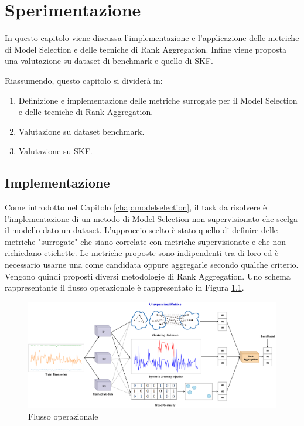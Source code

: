 \chapter{Sperimentazione}
\label{chap:impl}

In questo capitolo viene discussa l'implementazione e l'applicazione delle metriche di Model Selection e delle tecniche di Rank Aggregation. Infine viene proposta una valutazione su dataset di benchmark e quello di SKF.

Riassumendo, questo capitolo si dividerà in:
\begin{enumerate}
	\item Definizione e implementazione delle metriche surrogate per il Model Selection e delle tecniche di Rank Aggregation.
	\item Valutazione su dataset benchmark.
	\item Valutazione su SKF.
\end{enumerate}


\section{Implementazione}
Come introdotto nel Capitolo \ref{chap:modelselection}, il task da risolvere è l'implementazione di un metodo di Model Selection non supervisionato che scelga il modello dato un dataset. L'approccio scelto è stato quello di definire delle metriche "surrogate" che siano correlate con metriche supervisionate e che non richiedano etichette. Le metriche proposte sono indipendenti tra di loro ed è necessario usarne una come candidata oppure aggregarle secondo qualche criterio. Vengono quindi proposti diversi metodologie di Rank Aggregation. Uno schema rappresentante il flusso operazionale è rappresentato in Figura \ref{flow-scheme}.
\begin{figure}[t]
	\centering
	\includegraphics[width=14cm, scale=1]{images/model-selection-scheme}
	\caption{Flusso operazionale}
	\label{flow-scheme}
		
\end{figure}

